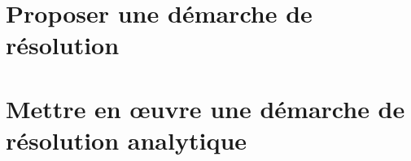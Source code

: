
\proffalse

\section{Proposer une démarche de résolution}
\begin{multicols}{2}


\end{multicols}

\section{Mettre en œuvre une démarche de résolution analytique}
\begin{multicols}{2}





\end{multicols}


%
%
%
%
%
%
%
%
%